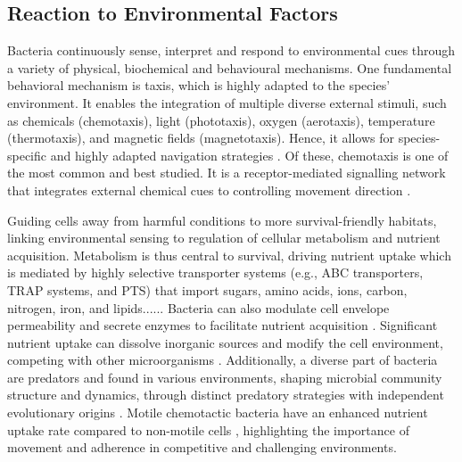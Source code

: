 \subsection{Reaction to Environmental Factors}
Bacteria continuously sense, interpret and respond to environmental cues through a
variety of physical, biochemical and behavioural mechanisms.
One fundamental behavioral mechanism is taxis, which is highly adapted to the species'
environment. It enables the integration of multiple diverse external stimuli, such as
chemicals (chemotaxis), light (phototaxis), oxygen (aerotaxis), temperature
(thermotaxis), and magnetic fields (magnetotaxis). Hence, it allows for species-specific
and highly adapted navigation strategies \cite{Krell2011}. Of these, chemotaxis is one of
the most common and best studied. It is a receptor-mediated signalling network that
integrates external chemical cues to controlling movement direction \cite{Nikita2009, Bourret2002}.

Guiding cells away from harmful conditions to more survival-friendly habitats, linking
environmental sensing to regulation of cellular metabolism and nutrient acquisition.
Metabolism is thus central to survival, driving nutrient uptake which is mediated by
highly selective transporter systems (e.g., ABC transporters, TRAP systems, and PTS) that
import sugars, amino acids, ions, carbon, nitrogen, iron, and lipids...... Bacteria can
also modulate cell envelope permeability and secrete enzymes to facilitate nutrient
acquisition \cite{Davies2021, Niederweis2008, Tanaka2018, Li2025}.
Significant nutrient uptake can dissolve inorganic sources and modify the cell
environment, competing with other microorganisms \cite{Caron1994}. Additionally, a
diverse part of bacteria are predators and found in various environments, shaping
microbial community structure and dynamics, through distinct predatory strategies with
independent evolutionary origins \cite{Velicer2009, Rory2015}.
Motile chemotactic bacteria have an enhanced nutrient uptake rate compared to non-motile
cells \cite{Watteaux2015}, highlighting the importance of movement and adherence in
competitive and challenging environments.

